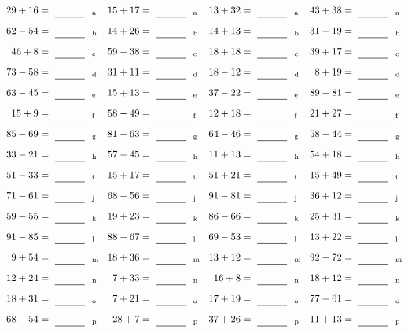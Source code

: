 \documentclass
[
  draft    = true,
  fontsize = 11pt,
  parskip  = half-
]
{scrartcl}
\begin{document}
\clearpage
\begin{align*}
    \pline{29+16}&=\rline{a}
  & \pline{15+17}&=\rline{a}
  & \pline{13+32}&=\rline{a}
  & \pline{43+38}&=\rline{a} \\[1ex]
    \pline{62-54}&=\rline{b}
  & \pline{14+26}&=\rline{b}
  & \pline{14+13}&=\rline{b}
  & \pline{31-19}&=\rline{b} \\[1ex]
    \pline{46+8}&=\rline{c}
  & \pline{59-38}&=\rline{c}
  & \pline{18+18}&=\rline{c}
  & \pline{39+17}&=\rline{c} \\[1ex]
    \pline{73-58}&=\rline{d}
  & \pline{31+11}&=\rline{d}
  & \pline{18-12}&=\rline{d}
  & \pline{8+19}&=\rline{d} \\[1ex]
    \pline{63-45}&=\rline{e}
  & \pline{15+13}&=\rline{e}
  & \pline{37-22}&=\rline{e}
  & \pline{89-81}&=\rline{e} \\[1ex]
    \pline{15+9}&=\rline{f}
  & \pline{58-49}&=\rline{f}
  & \pline{12+18}&=\rline{f}
  & \pline{21+27}&=\rline{f} \\[1ex]
    \pline{85-69}&=\rline{g}
  & \pline{81-63}&=\rline{g}
  & \pline{64-46}&=\rline{g}
  & \pline{58-44}&=\rline{g} \\[1ex]
    \pline{33-21}&=\rline{h}
  & \pline{57-45}&=\rline{h}
  & \pline{11+13}&=\rline{h}
  & \pline{54+18}&=\rline{h} \\[1ex]
    \pline{51-33}&=\rline{i}
  & \pline{15+17}&=\rline{i}
  & \pline{51+21}&=\rline{i}
  & \pline{15+49}&=\rline{i} \\[1ex]
    \pline{71-61}&=\rline{j}
  & \pline{68-56}&=\rline{j}
  & \pline{91-81}&=\rline{j}
  & \pline{36+12}&=\rline{j} \\[1ex]
    \pline{59-55}&=\rline{k}
  & \pline{19+23}&=\rline{k}
  & \pline{86-66}&=\rline{k}
  & \pline{25+31}&=\rline{k} \\[1ex]
    \pline{91-85}&=\rline{l}
  & \pline{88-67}&=\rline{l}
  & \pline{69-53}&=\rline{l}
  & \pline{13+22}&=\rline{l} \\[1ex]
    \pline{9+54}&=\rline{m}
  & \pline{18+36}&=\rline{m}
  & \pline{13+12}&=\rline{m}
  & \pline{92-72}&=\rline{m} \\[1ex]
    \pline{12+24}&=\rline{n}
  & \pline{7+33}&=\rline{n}
  & \pline{16+8}&=\rline{n}
  & \pline{18+12}&=\rline{n} \\[1ex]
    \pline{18+31}&=\rline{o}
  & \pline{7+21}&=\rline{o}
  & \pline{17+19}&=\rline{o}
  & \pline{77-61}&=\rline{o} \\[1ex]
    \pline{68-54}&=\rline{p}
  & \pline{28+7}&=\rline{p}
  & \pline{37+26}&=\rline{p}
  & \pline{11+13}&=\rline{p}
\end{align*}
\end{document}
